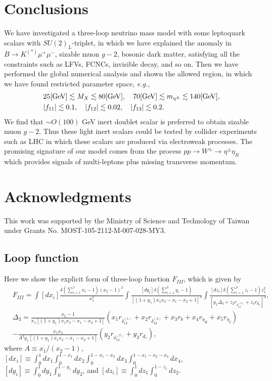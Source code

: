 \documentclass[%
showkeys,12pt,
preprint,preprintnumbers,nofootinbib,
groupedaddress,superscriptaddress,amsmath,amssymb]{revtex4}
\newcommand{\nn}{\nonumber}
\numberwithin{equation}{section}
\begin{document}
\section{Conclusions}
We have investigated a three-loop neutrino mass model 
with some leptoquark scalars with $SU(2)_L$-triplet, in which we have explained the anomaly in $B\to K^{(*)} \mu^+\mu^-$, sizable muon $g-2$, bosonic dark matter, satisfying all the constraints such as LFVs, FCNCs, invisible decay, and so on.
Then we have performed the global numerical analysis and shown the allowed region, in which we have found restricted parameter space, {\it e.g.,}
\begin{align*}
& 25  {\rm [GeV]} \lesssim M_X \lesssim 80 {\rm [GeV]},\quad  70  {\rm [GeV]}\lesssim m_{\eta^\pm} \lesssim 140 {\rm [GeV]},
\\
& |f_{11}| \lesssim {0.1},\quad  |f_{12}| \lesssim {0.02},\quad  |f_{13}| \lesssim {0.2}.
\end{align*}  
We find that $\sim O(100)$ GeV inert doublet scalar is preferred to obtain sizable muon $g-2$.
Thus these light inert scalars could be tested by collider experiments such as LHC in which these scalars are produced via electroweak processes.
The promising signature of our model comes from the process $pp \to W^\pm \to \eta^\pm \eta_R$ which provides signals of multi-leptons plus missing transverse momentum. 
 




\section*{Acknowledgments}
This work was supported by the Ministry of Science and Technology
of Taiwan under Grants No. MOST-105-2112-M-007-028-MY3.


\begin{appendix}
\section{Loop function}
Here we show the explicit form of three-loop function $F_{III}$, which is given by
\begin{align*}
&F_{III}=\int [dx_i]\frac{\delta(\sum_{i=1}^5 x_i-1)(x_2-1)^2}{x_1^2}
\int \frac{[dy_i] \delta(\sum_{i=1}^3 y_i-1)}{[(1+y_1)x_1x_2-x_1-x_2+1]^3}
\int \frac{[dz_i] \delta(\sum_{i=1}^3 z_i-1)z_1^2}{[y_1\Delta_3+z_2 r_{\delta_{13}^{(2)}} +z_3 r_{d_a}]^3},\\
&
\Delta_3=\frac{x_2-1}{x_1[(1+y_1)x_1x_2-x_1-x_2+1] }
\left( x_1 r_{\delta_{13}^{(1)}} +x_2r_{\delta_{13}^{(2)}}+x_3r_{b}+x_4 r_{\eta_R}+x_5 r_{\eta_I}\right)\nn\\
&-\frac{x_1x_2}{A^2 y_1[(1+y_1)x_1x_2-x_1-x_2+1]}
\left( y_2 r_{\delta_{13}^{(3)}}+y_3r_{d_c}\right),
\end{align*}
where $A\equiv x_1/(x_2-1)$, $[dx_i]\equiv \int_0^1dx_1\int_0^{1-x_1}dx_2\int_0^{1-x_1-x_2}dx_3\int_0^{1-x_1-x_2-x_3}dx_4$, $[dy_i]\equiv \int_0^1dy_1\int_0^{1-y_1}dy_2$, and $[dz_i]\equiv \int_0^1dz_1\int_0^{1-z_1}dz_2$.


\end{appendix}
\end{document}
